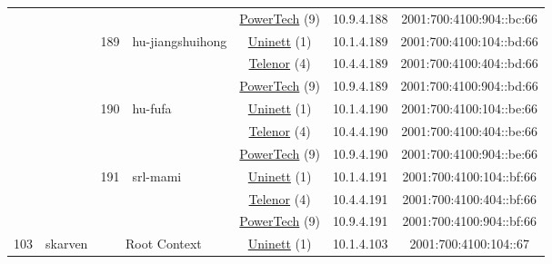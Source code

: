 \begin{small}
\begin{center}
\begin{longtable}{|c|c|c|c|c|c|c|c|}
  &  &  &  & \multicolumn{2}{|c|}{\tiny{\href{http://www.powertech.no}{PowerTech} (9)}} & \tiny{10.9.4.188} & \tiny{2001:700:4100:904::bc:66} \\* \cline{3-3}\cline{4-4}\cline{5-5}\cline{6-6}\cline{7-7}\cline{8-8}
  &  & \multirow{3}{*}{\tiny{189}} & \multicolumn{1}{|l|}{\multirow{3}{*}{\tiny{hu-jiangshuihong}}} & \multicolumn{2}{|c|}{\tiny{\href{https://www.uninett.no}{Uninett} (1)}} & \tiny{10.1.4.189} & \tiny{2001:700:4100:104::bd:66} \\* \cline{5-5}\cline{6-6}\cline{7-7}\cline{8-8}
  &  &  &  & \multicolumn{2}{|c|}{\tiny{\href{https://www.telenor.no}{Telenor} (4)}} & \tiny{10.4.4.189} & \tiny{2001:700:4100:404::bd:66} \\* \cline{5-5}\cline{6-6}\cline{7-7}\cline{8-8}
  &  &  &  & \multicolumn{2}{|c|}{\tiny{\href{http://www.powertech.no}{PowerTech} (9)}} & \tiny{10.9.4.189} & \tiny{2001:700:4100:904::bd:66} \\* \cline{3-3}\cline{4-4}\cline{5-5}\cline{6-6}\cline{7-7}\cline{8-8}
  &  & \multirow{3}{*}{\tiny{190}} & \multicolumn{1}{|l|}{\multirow{3}{*}{\tiny{hu-fufa}}} & \multicolumn{2}{|c|}{\tiny{\href{https://www.uninett.no}{Uninett} (1)}} & \tiny{10.1.4.190} & \tiny{2001:700:4100:104::be:66} \\* \cline{5-5}\cline{6-6}\cline{7-7}\cline{8-8}
  &  &  &  & \multicolumn{2}{|c|}{\tiny{\href{https://www.telenor.no}{Telenor} (4)}} & \tiny{10.4.4.190} & \tiny{2001:700:4100:404::be:66} \\* \cline{5-5}\cline{6-6}\cline{7-7}\cline{8-8}
  &  &  &  & \multicolumn{2}{|c|}{\tiny{\href{http://www.powertech.no}{PowerTech} (9)}} & \tiny{10.9.4.190} & \tiny{2001:700:4100:904::be:66} \\* \cline{3-3}\cline{4-4}\cline{5-5}\cline{6-6}\cline{7-7}\cline{8-8}
  &  & \multirow{3}{*}{\tiny{191}} & \multicolumn{1}{|l|}{\multirow{3}{*}{\tiny{srl-mami}}} & \multicolumn{2}{|c|}{\tiny{\href{https://www.uninett.no}{Uninett} (1)}} & \tiny{10.1.4.191} & \tiny{2001:700:4100:104::bf:66} \\* \cline{5-5}\cline{6-6}\cline{7-7}\cline{8-8}
  &  &  &  & \multicolumn{2}{|c|}{\tiny{\href{https://www.telenor.no}{Telenor} (4)}} & \tiny{10.4.4.191} & \tiny{2001:700:4100:404::bf:66} \\* \cline{5-5}\cline{6-6}\cline{7-7}\cline{8-8}
  &  &  &  & \multicolumn{2}{|c|}{\tiny{\href{http://www.powertech.no}{PowerTech} (9)}} & \tiny{10.9.4.191} & \tiny{2001:700:4100:904::bf:66} \\ \hline
 \multirow{51}{*}{\tiny{103}} & \multicolumn{1}{|l|}{\multirow{51}{*}{\tiny{skarven}}} & \multicolumn{2}{|c|}{\multirow{3}{*}{\tiny{Root Context}}} & \multicolumn{2}{|c|}{\tiny{\href{https://www.uninett.no}{Uninett} (1)}} & \tiny{10.1.4.103} & \tiny{2001:700:4100:104::67} \\* \cline{5-5}\cline{6-6}\cline{7-7}\cline{8-8}

\end{longtable}
\end{center}
\end{small}
